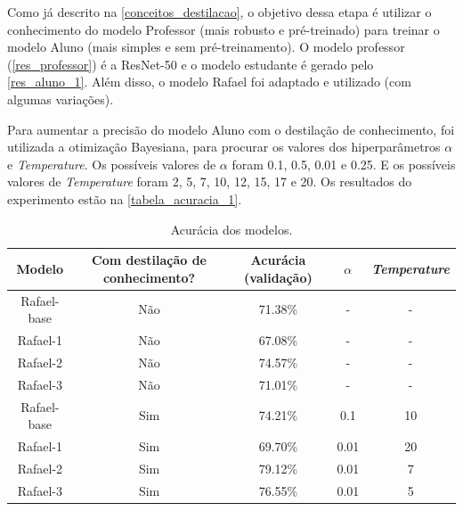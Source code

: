 Como já descrito na \autoref{conceitos_destilacao}, o objetivo dessa etapa é utilizar o conhecimento do modelo
Professor (mais robusto e pré-treinado) para treinar o modelo Aluno (mais simples e sem pré-treinamento).
O modelo professor (\autoref{res_professor}) é a ResNet-50  \cite{resnet} e o modelo estudante é gerado pelo
\autoref{res_aluno_1}.
Além disso, o modelo Rafael \cite{rafael} foi adaptado e utilizado (com algumas variações).

Para aumentar a precisão do modelo Aluno com o destilação de conhecimento, foi utilizada a otimização
Bayesiana, para procurar os valores dos hiperparâmetros $\alpha$ e \textit{Temperature}.
Os possíveis valores de $\alpha$ foram 0.1, 0.5, 0.01 e 0.25.
E os possíveis valores de \textit{Temperature} foram 2, 5, 7, 10, 12, 15, 17 e 20.
Os resultados do experimento estão na \autoref{tabela_acuracia_1}.

\begin{center}
\begin{table}[htb]
\centering
\ABNTEXfontereduzida
\caption[Acurácia dos modelos]{Acurácia dos modelos.}
\label{tabela_acuracia_1}
\begin{tabular}{ |c|c|c|c|c| }
	\hline
	\textbf{Modelo} & \textbf{Com destilação de conhecimento?}  & \textbf{Acurácia (validação)}
		   & \textbf{$\alpha$} & \textbf{\textit{Temperature}} \\
	\hline
	Rafael-base 	& 	Não 	& 	71.38\%	& 	- 	& 	-	 \\
	Rafael-1 	& 	Não 	& 	67.08\%	& 	- 	& 	-	 \\
	Rafael-2 	& 	Não 	& 	74.57\%	& 	- 	& 	-	 \\
	Rafael-3 	& 	Não 	& 	71.01\%	& 	- 	& 	-	 \\
	Rafael-base 	& 	Sim 	& 	74.21\%	& 	0.1 	& 	10	 \\
	Rafael-1 	& 	Sim 	& 	69.70\%	& 	0.01 	& 	20	 \\
	Rafael-2 	& 	Sim 	& 	79.12\%	& 	0.01 	& 	7	 \\
	Rafael-3 	& 	Sim 	& 	76.55\%	& 	0.01 	& 	5	 \\
	\hline
\end{tabular}
\end{table}
\end{center}


